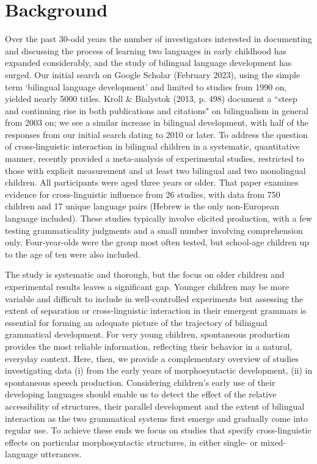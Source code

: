 \documentclass[output=paper]{langscibook}
\begin{document}
\section{Background}

Over the past 30-odd years the number of investigators interested in documenting and discussing the process of learning two languages in early childhood has expanded considerably, and the study of bilingual language development has surged. Our initial search on Google Scholar (February 2023), using the simple term ‘bilingual language development’ and limited to studies from 1990 on, yielded nearly 5000 titles. Kroll \& Bialystok (2013, p. 498) document a ``steep and continuing rise in both publications and citations" on bilingualism in general from 2003 on; we see a similar increase in bilingual development, with half of the responses from our initial search dating to 2010 or later. To address the question of cross-linguistic interaction in bilingual children in a systematic, quantitative manner, \citet{VanDijkEtAl2022} recently provided a meta-analysis of experimental studies, restricted to those with explicit measurement and at least two bilingual and two monolingual children. All participants were aged three years or older. That paper examines evidence for cross-linguistic influence from 26 studies, with data from 750 children and 17 unique language pairs (Hebrew is the only non-European language included). These studies typically involve elicited production, with a few testing grammaticality judgments and a small number involving comprehension only. Four-year-olds were the group most often tested, but school-age children up to the age of ten were also included.

The \citeauthor{VanDijkEtAl2022} study is systematic and thorough, but the focus on older children and experimental results leaves a significant gap. Younger children may be more variable and difficult to include in well-controlled experiments but assessing the extent of separation or cross-linguistic interaction in their emergent grammars is essential for forming an adequate picture of the trajectory of bilingual grammatical development. For very young children, spontaneous production provides the most reliable information, reflecting their behavior in a natural, everyday context. Here, then, we provide a complementary overview of studies investigating data (i) from the early years of morphosyntactic development, (ii) in spontaneous speech production. Considering children’s early use of their developing languages should enable us to detect the effect of the relative accessibility of structures, their parallel development and the extent of bilingual interaction as the two grammatical systems first emerge and gradually come into regular use. To achieve these ends we focus on studies that specify cross-linguistic effects on particular morphosyntactic structures, in either single- or mixed-language utterances. 
\end{document}
